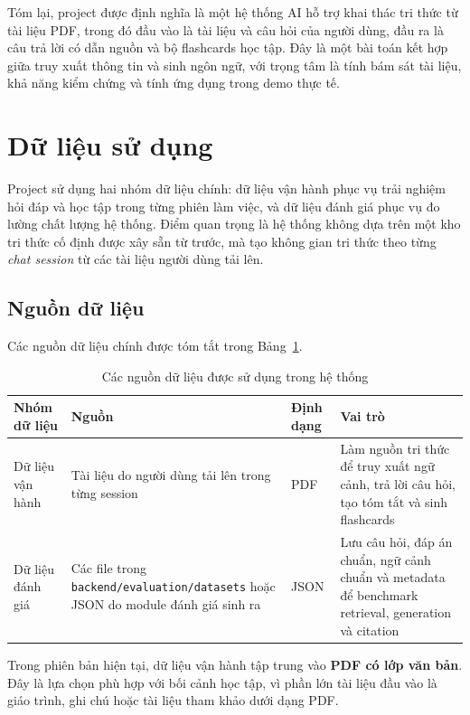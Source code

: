 \documentclass[12pt]{ai_conquer2026}
\begin{document}
Tóm lại, project được định nghĩa là một hệ thống AI hỗ trợ khai thác tri thức từ tài liệu PDF, trong đó đầu vào là tài liệu và câu hỏi của người dùng, đầu ra là câu trả lời có dẫn nguồn và bộ flashcards học tập. Đây là một bài toán kết hợp giữa truy xuất thông tin và sinh ngôn ngữ, với trọng tâm là tính bám sát tài liệu, khả năng kiểm chứng và tính ứng dụng trong demo thực tế.



\section{Dữ liệu sử dụng}

Project sử dụng hai nhóm dữ liệu chính: dữ liệu vận hành phục vụ trải nghiệm hỏi đáp và học tập trong từng phiên làm việc, và dữ liệu đánh giá phục vụ đo lường chất lượng hệ thống. Điểm quan trọng là hệ thống không dựa trên một kho tri thức cố định được xây sẵn từ trước, mà tạo không gian tri thức theo từng \textit{chat session} từ các tài liệu người dùng tải lên.

\subsection{Nguồn dữ liệu}

Các nguồn dữ liệu chính được tóm tắt trong Bảng~\ref{tab:data-sources}.

\begin{table}[H]
\centering
\small
\begin{tabular}{|p{2.8cm}|p{4.5cm}|p{1.8cm}|p{5.3cm}|}
\hline
\textbf{Nhóm dữ liệu} & \textbf{Nguồn} & \textbf{Định dạng} & \textbf{Vai trò} \\ \hline
Dữ liệu vận hành & Tài liệu do người dùng tải lên trong từng session & PDF & Làm nguồn tri thức để truy xuất ngữ cảnh, trả lời câu hỏi, tạo tóm tắt và sinh flashcards \\ \hline
Dữ liệu đánh giá & Các file trong \texttt{backend/evaluation/datasets} hoặc JSON do module đánh giá sinh ra & JSON & Lưu câu hỏi, đáp án chuẩn, ngữ cảnh chuẩn và metadata để benchmark retrieval, generation và citation \\ \hline
\end{tabular}
\caption{Các nguồn dữ liệu được sử dụng trong hệ thống}
\label{tab:data-sources}
\end{table}

Trong phiên bản hiện tại, dữ liệu vận hành tập trung vào \textbf{PDF có lớp văn bản}. Đây là lựa chọn phù hợp với bối cảnh học tập, vì phần lớn tài liệu đầu vào là giáo trình, ghi chú hoặc tài liệu tham khảo dưới dạng PDF.
\end{document}

